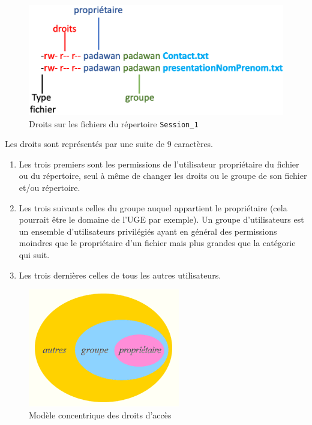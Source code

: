 \documentclass{article}
\begin{document}
\begin{exercice}
\begin{enumerate}
\begin{figure}[h!]
    \begin{center}
    \includegraphics[scale=0.2]{droitsFichier.png}
    \caption{Droits sur les fichiers du répertoire \texttt{Session\_1}}
     \end{center}
\end{figure}    

\end{enumerate}

\newpage

Les droits sont représentés par une suite de 9 caractères. 

\begin{enumerate}
\item
Les trois premiers sont les permissions de l'utilisateur propriétaire du fichier ou du répertoire, seul à même de changer les droits ou le groupe de son fichier et/ou répertoire.
\item
Les trois suivants celles du groupe auquel appartient le propriétaire (cela pourrait être le domaine de l'UGE par exemple). Un groupe d'utilisateurs est un ensemble d'utilisateurs 
privilégiés ayant en général des permissions moindres que le propriétaire d'un fichier mais plus grandes que la catégorie qui suit.
\item
Les trois dernières celles de tous les autres utilisateurs.
\end{enumerate}

\begin{figure}[h!]
    \begin{center}
    \includegraphics[scale=0.6]{droits2.png}
    \caption{Modèle concentrique des droits d'accès}
     \end{center}
\end{figure}    


\end{exercice}
\end{document}
